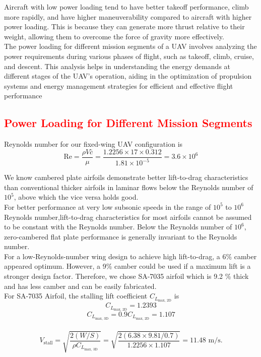 \documentclass[12 pt]{article}
\begin{document}
Aircraft with low power loading tend to have better takeoff performance, climb more rapidly, and have higher maneuverability compared to aircraft with higher power loading. This is because they can generate more thrust relative to their weight, allowing them to overcome the force of gravity more effectively.\\

The power loading for different mission segments of a UAV involves analyzing the power requirements during various phases of flight, such as takeoff, climb, cruise, and descent. This analysis helps in understanding the energy demands at different stages of the UAV's operation, aiding in the optimization of propulsion systems and energy management strategies for efficient and effective flight performance

\subsection{\textcolor{red}{Power Loading for Different Mission Segments}}


Reynolds number for our fixed-wing UAV configuration is\begin{equation} 
\text{Re} = \frac{\rho V \bar{c}}{\mu} = \frac{1.2256 \times 17 \times 0.312}{1.81 \times 10^{-5}} = 3.6 \times 10^6 
\tag{3.10}
\end{equation}

We know cambered plate airfoils demonstrate better lift-to-drag characteristics than conventional thicker airfoils in laminar flows below the Reynolds number of ${10^5}$, above which the vice versa holds good.\\

For better performance at very low subsonic speeds in the range of ${10^5}$ to ${10^6}$ Reynolds number,lift-to-drag characteristics for most airfoils cannot be assumed to be constant with the Reynolds number. Below the Reynolds number of ${10^6}$, zero-cambered flat plate performance is generally invariant to the Reynolds number. \\

For a low-Reynolds-number wing design to achieve high lift-to-drag, a 6\% camber appeared optimum. However, a 9\% camber could be used if a maximum lift is a stronger design factor. Therefore, we chose SA-7035 airfoil which is 9.2 \% thick and has less camber and can be easily fabricated.\\

For SA-7035 Airfoil, the stalling lift coefficient $C_{L_{\text{max, 2D}}}$ is 
$$C_{L_{\text{max, 2D}}} = 1.2393 $$
$$C_{L_{\text{max, 3D}}} = 0.9 C_{L_{\text{max, 2D}}} = 1.107$$\\
\begin{equation} 
V_{\text{stall}} = \sqrt{\frac{2(W/S)}{\rho C_{L_{\text{max, 3D}}}}} = \sqrt{\frac{2(6.38 \times 9.81 / 0.7)}{1.2256 \times 1.107}} = 11.48 \text{ m/s}. 
\tag{3.11}
\end{equation}
\\ 
\end{document}
